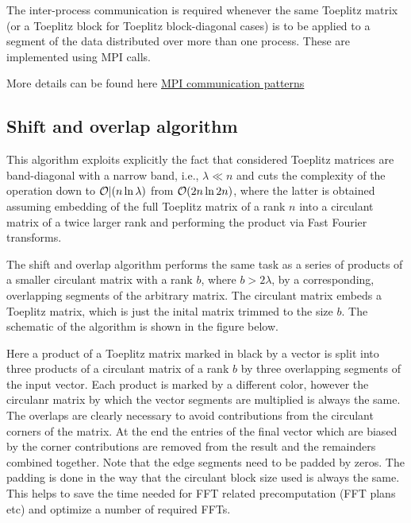 The inter-\/process communication is required whenever the same Toeplitz matrix (or a Toeplitz block for Toeplitz block-\/diagonal cases) is to be applied to a segment of the data distributed over more than one process. These are implemented using M\-P\-I calls.

More details can be found here \hyperlink{toeplitz_algo_communication}{M\-P\-I communication patterns} \subsection{Shift and overlap algorithm}\label{toeplitz_algo_shiftoverlap}
This algorithm exploits explicitly the fact that considered Toeplitz matrices are band-\/diagonal with a narrow band, i.\-e., $\lambda \ll n$ and cuts the complexity of the operation down to $ {\cal O|}(n \ln \lambda)$ from ${\cal O}(2 n \ln 2 n)$, where the latter is obtained assuming embedding of the full Toeplitz matrix of a rank $ n$ into a circulant matrix of a twice larger rank and performing the product via Fast Fourier transforms.

The shift and overlap algorithm performs the same task as a series of products of a smaller circulant matrix with a rank $ b$, where $ b > 2\lambda$, by a corresponding, overlapping segments of the arbitrary matrix. The circulant matrix embeds a Toeplitz matrix, which is just the inital matrix trimmed to the size $ b$. The schematic of the algorithm is shown in the figure below.

 Here a product of a Toeplitz matrix marked in black by a vector is split into three products of a circulant matrix of a rank $ b$ by three overlapping segments of the input vector. Each product is marked by a different color, however the circulanr matrix by which the vector segments are multiplied is always the same. The overlaps are clearly necessary to avoid contributions from the circulant corners of the matrix. At the end the entries of the final vector which are biased by the corner contributions are removed from the result and the remainders combined together. Note that the edge segments need to be padded by zeros. The padding is done in the way that the circulant block size used is always the same. This helps to save the time needed for F\-F\-T related precomputation (F\-F\-T plans etc) and optimize a number of required F\-F\-Ts.

